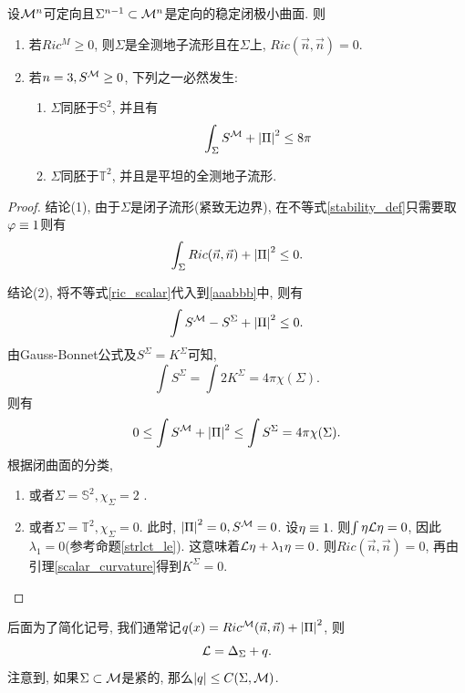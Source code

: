 \begin{corollary}
    设${\mathcal{M}}^n$可定向且$\Sigma^{n-1} \subset {\mathcal{M}}^n$是定向的稳定闭极小曲面. 则
    \begin{enumerate}
        \item 若$Ric^M \ge 0$, 则$\Sigma$是全测地子流形且在$\Sigma$上, $Ric(\vec{n},\vec{n})=0$.
        \item 若$n=3, S^{\mathcal{M}} \ge 0$, 下列之一必然发生:
        \begin{enumerate}
            \item $\Sigma$同胚于$\mathbb{S}^2$, 并且有
            \begin{equation}
                \int_\Sigma S^{\mathcal{M}}+\left | {\Pi} \right |^2 \le 8\pi
            \end{equation}
            \item $\Sigma$同胚于$\mathbb{T}^2$, 并且是平坦的全测地子流形.
        \end{enumerate}
    \end{enumerate}
\end{corollary}
\begin{proof}
    结论(1), 由于$\Sigma$是闭子流形(紧致无边界), 在不等式\eqref{stability_def}只需要取$\varphi\equiv 1$则有
    \begin{equation} \label{aaabbb}
        \int_\Sigma Ric(\vec{n},\vec{n})+\left | {\Pi} \right |^2 \le 0.
    \end{equation}
    \par 结论(2), 将不等式\eqref{ric_scalar}代入到\eqref{aaabbb}中, 则有
    \begin{equation}
        \int S^{\mathcal{M}}- S^\Sigma + \left | {\Pi} \right |^2 \le 0.
    \end{equation}
    由Gauss-Bonnet公式及$S^\Sigma=K^\Sigma$可知,
    \begin{equation}
        \int S^\Sigma = \int 2K^\Sigma = 4\pi \chi(\Sigma).
    \end{equation}
    则有
    \begin{equation}
        0 \le \int S^{\mathcal{M}} + \left | {\Pi} \right |^2 \le \int S^\Sigma = 4\pi\chi(\Sigma).
    \end{equation}
    根据闭曲面的分类, 
    \begin{enumerate}
        \item 或者$\Sigma=\mathbb{S}^2, \chi_{\Sigma}=2$ .
        \item 或者$\Sigma=\mathbb{T}^2, \chi_{\Sigma}=0$. 此时, $\left | {\Pi} \right |^2=0, S^{\mathcal{M}}=0$. 设$\eta\equiv 1$. 则$\int \eta\mathcal{L} \eta=0$, 因此$\lambda_1=0$(参考命题\eqref{strlct_le}). 这意味着$\mathcal{L} \eta +\lambda_1\eta=0$. 则$Ric(\vec{n},\vec{n})=0$, 再由引理\eqref{scalar_curvature}得到$K^\Sigma=0$.
    \end{enumerate}
\end{proof}
后面为了简化记号, 我们通常记$q(x)=Ric^{\mathcal{M}}(\vec{n},\vec{n})+\left | {\Pi} \right |^2$, 则 
\begin{equation}
    \mathcal{L}=\Delta_\Sigma+q.
\end{equation}
注意到, 如果$\Sigma \subset {\mathcal{M}}$是紧的, 那么$\left | q \right | \le C(\Sigma, {\mathcal{M}})$. 


